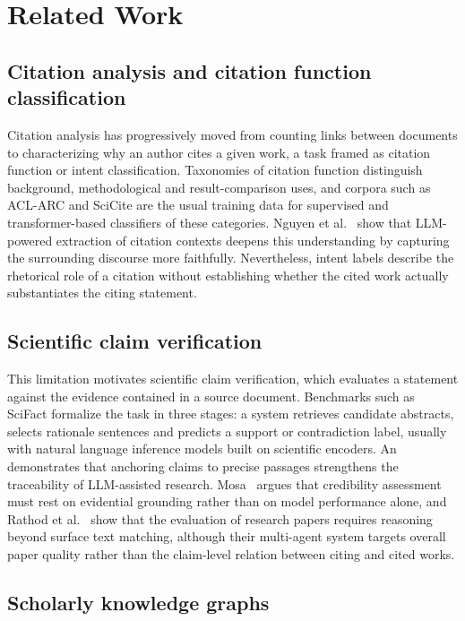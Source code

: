 \documentclass[lettersize,journal]{IEEEtran}
\begin{document}
\section{Related Work}
\label{sec:related}

\subsection{Citation analysis and citation function classification}

Citation analysis has progressively moved from counting links between documents to characterizing why an author cites a given work, a task framed as citation function or intent classification. Taxonomies of citation function distinguish background, methodological and result-comparison uses, and corpora such as ACL-ARC and SciCite are the usual training data for supervised and transformer-based classifiers of these categories. Nguyen et al.~\cite{nguyen2026deepening} show that LLM-powered extraction of citation contexts deepens this understanding by capturing the surrounding discourse more faithfully. Nevertheless, intent labels describe the rhetorical role of a citation without establishing whether the cited work actually substantiates the citing statement.

\subsection{Scientific claim verification}

This limitation motivates scientific claim verification, which evaluates a statement against the evidence contained in a source document. Benchmarks such as SciFact formalize the task in three stages: a system retrieves candidate abstracts, selects rationale sentences and predicts a support or contradiction label, usually with natural language inference models built on scientific encoders. An~\cite{an2026evidence} demonstrates that anchoring claims to precise passages strengthens the traceability of LLM-assisted research. Mosa~\cite{mosa2026charting} argues that credibility assessment must rest on evidential grounding rather than on model performance alone, and Rathod et al.~\cite{rathod2025beyond} show that the evaluation of research papers requires reasoning beyond surface text matching, although their multi-agent system targets overall paper quality rather than the claim-level relation between citing and cited works.

\subsection{Scholarly knowledge graphs}
\end{document}
